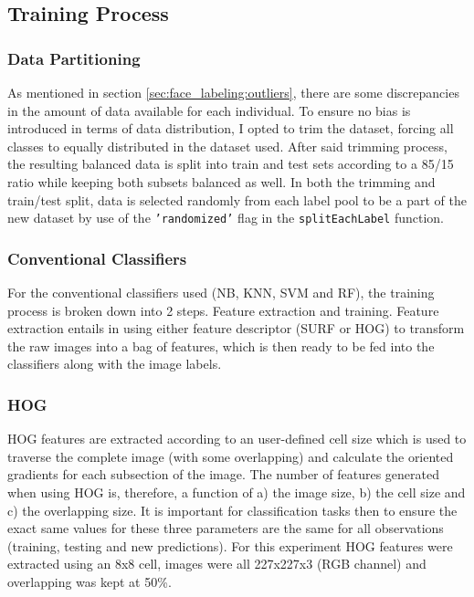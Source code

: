 \documentclass[11pt]{article}
\begin{document}
    \subsection{Training Process}
        \subsubsection{Data Partitioning}
            As mentioned in section \ref{sec:face_labeling:outliers}, there are some discrepancies in the amount of data available for each individual. To ensure no bias is introduced in terms of data distribution, I opted to trim the dataset, forcing all classes to equally distributed in the dataset used. After said trimming process, the resulting balanced data is split into train and test sets according to a 85/15 ratio while keeping both subsets balanced as well. In both the trimming and train/test split, data is selected randomly from each label pool to be a part of the new dataset by use of the \texttt{'randomized'} flag in the \texttt{splitEachLabel} function.
        \subsubsection{Conventional Classifiers}
            For the conventional classifiers used (NB, KNN, SVM and RF), the training process is broken down into 2 steps. Feature extraction and training. Feature extraction entails in using either feature descriptor (SURF or HOG) to transform the raw images into a bag of features, which is then ready to be fed into the classifiers along with the image labels.
        \subsubsection*{HOG}
            HOG features are extracted according to an user-defined cell size which is used to traverse the complete image (with some overlapping) and calculate the oriented gradients for each subsection of the image. The number of features generated when using HOG is, therefore, a function of a) the image size, b) the cell size and c) the overlapping size. It is important for classification tasks then to ensure the exact same values for these three parameters are the same for all observations (training, testing and new predictions). For this experiment HOG features were extracted using an 8x8 cell, images were all 227x227x3 (RGB channel) and overlapping was kept at 50\%.
\end{document}
